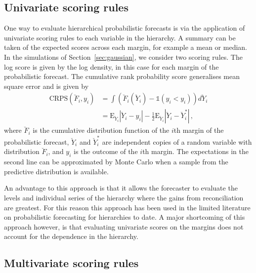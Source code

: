 \documentclass[12pt]{article}
\def\E{\text{E}}
\theoremstyle{definition}
\begin{document}
\subsection{Univariate scoring rules}

One way to evaluate hierarchical probabilistic forecasts is via the application of univariate scoring rules to each variable in the hierarchy. A summary can be taken of the expected scores across each margin, for example a mean or median. In the simulations of Section~\ref{sec:gaussian}, we consider two scoring rules. The log score is given by the log density, in this case for each margin of the probabilistic forecast. The cumulative rank probability score generalises mean square error and is given by
\begin{align} \label{eq:CRPS}
\text{CRPS}(\breve{F}_i,y_{i}) &=\int \left(\breve{F}_i(\breve{Y}_i)-\mathbb{1}(y_i<y_{i})\right)d\breve{Y}_i\\ &=\E_{\breve{Y}_i}|\breve{Y}_{i}-y_{i}| - \frac{1}{2}\E_{\breve{Y}_i}|\breve{Y}_{i}-\breve{Y}^*_{i}|\,,
\end{align}
where $\breve{F}_i$ is the cumulative distribution function of the $i$th margin of the probabilistic forecast, $\breve{Y}_i$ and $\breve{Y}^*_{i}$ are independent copies of a random variable with distribution $\breve{F}_i$, and $y_i$ is the outcome of the $i$th margin. The expectations in the second line can be approximated by Monte Carlo when a sample from the predictive distribution is available.

An advantage to this approach is that it allows the forecaster to evaluate the levels and individual series of the hierarchy where the gains from reconciliation are greatest. For this reason this approach has been used in the limited literature on probabilistic forecasting for hierarchies \citep{BenTaieb2017, JeoEtAl2018} to date. A major shortcoming of this approach however, is that evaluating univariate scores on the margins does not account for the dependence in the hierarchy.

\subsection{Multivariate scoring rules}
\end{document}
